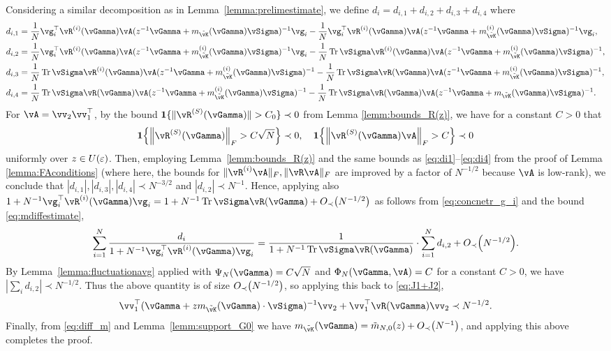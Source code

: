 \begin{proof-of-lemma}
	Considering a similar decomposition as in Lemma~\ref{lemma:prelimestimate}, we define
	$d_i=d_{i,1}+d_{i,2}+d_{i,3}+d_{i,4}$ where
	\begin{equation}\label{eq:di14_gamma}
	\begin{aligned}
	d_{i,1}&=\frac{1}{N}\vg_i^\top
\vR^{(i)}(\vGamma)\vA(z^{-1}\vGamma+m_{\tilde \vK}(\vGamma)\vSigma)^{-1}
	\vg_i-\frac{1}{N}\vg_i^\top
\vR^{(i)}(\vGamma)\vA(z^{-1}\vGamma+m_{\tilde \vK}^{(i)}(\vGamma)\vSigma)^{-1}\vg_i,\\
	d_{i,2}&=\frac{1}{N}\vg_i^\top
\vR^{(i)}(\vGamma)\vA(z^{-1}\vGamma+m_{\tilde \vK}^{(i)}(\vGamma)\vSigma)^{-1}
	\vg_i-\frac{1}{N}\Tr \vSigma
\vR^{(i)}(\vGamma)\vA(z^{-1}\vGamma+m_{\tilde \vK}^{(i)}(\vGamma)\vSigma)^{-1},\\
	d_{i,3}&=\frac{1}{N}\Tr \vSigma
\vR^{(i)}(\vGamma)\vA(z^{-1}\vGamma+m_{\tilde \vK}^{(i)}(\vGamma)\vSigma)^{-1}
	-\frac{1}{N}\Tr \vSigma \vR(\vGamma)\vA(z^{-1}\vGamma+m_{\tilde
\vK}^{(i)}(\vGamma)\vSigma)^{-1},\\
	d_{i,4}&=\frac{1}{N}\Tr \vSigma \vR(\vGamma)\vA(z^{-1}\vGamma+m_{\tilde
\vK}^{(i)}(\vGamma)\vSigma)^{-1}
	-\frac{1}{N}\Tr \vSigma \vR(\vGamma)\vA(z^{-1}\vGamma+m_{\tilde
\vK}(\vGamma)\vSigma)^{-1}.
	\end{aligned}
	\end{equation}
	For $\vA=\vv_2\vv_1^\top$, by the bound
$\bI\{\|\vR^{(S)}(\vGamma)\|>C_0\} \prec 0$
from Lemma \ref{lemm:bounds_R(z)}, we have for a constant $C>0$ that
	\begin{equation}
	\bI\left\{\norm{\vR^{(S)}(\vGamma)}_F>C\sqrt{N}\right\}\prec 0, \quad \bI\left\{\norm{\vR^{(S)}(\vGamma)\vA}_F>C\right\}\prec 0
	\end{equation} 
	uniformly over $z\in U(\varepsilon)$.
	Then, employing Lemma~\ref{lemm:bounds_R(z)} and the same bounds as
\eqref{eq:di1}--\eqref{eq:di4} from the proof of Lemma \ref{lemma:FAconditions}
(where here, the bounds for $\|\vR^{(i)}\vA\|_F,\|\vR\vA\|_F$ are
improved by a factor of $N^{-1/2}$ because $\vA$ is low-rank),
we conclude that $|d_{i,1}|,|d_{i,3}|,|d_{i,4}|
	\prec N^{-3/2}$ and $|d_{i,2}| \prec N^{-1}$.  
Hence, applying also $1+N^{-1}\vg_i^\top \vR^{(i)}(\vGamma)\vg_i
=1+N^{-1}\Tr \vSigma\vR(\vGamma)+\SD{N^{-1/2}}$ as follows from
\eqref{eq:concnetr_g_i} and the bound \eqref{eq:mdiffestimate},
	\[\sum_{i=1}^N\frac{d_i}{1+N^{-1}\vg_i^\top\vR^{(i)}(\vGamma)\vg_i}
=\frac{1}{1+N^{-1}\Tr \vSigma\vR(\vGamma)}
\cdot \sum_{i=1}^N d_{i,2}+\SD{N^{-1/2}}.\]
	By Lemma~\ref{lemma:fluctuationavg} applied with
$\Psi_N(\vGamma)=C\sqrt{N}$ and $\Phi_N(\vGamma,\vA)=C$ for a constant $C>0$,
we have $|\sum_i d_{i,2}| \prec N^{-1/2} $. Thus the above quantity is of size
$\SD{N^{-1/2}}$, so applying this back to \eqref{eq:J1+J2},
	\begin{align*}
		\vv_1^\top(\vGamma+zm_{\tilde \vK}(\vGamma)\cdot\vSigma
)^{-1}\vv_2+\vv_1^\top\vR(\vGamma)\vv_2 \prec N^{-1/2}.
	\end{align*}
	Finally, from \eqref{eq:diff_m} and Lemma~\ref{lemm:support_G0} 
we have $m_{\tilde \vK}(\vGamma)=\tilde m_{N,0}(z)+\SD{N^{-1}}$, and applying
this above completes the proof.
\end{proof-of-lemma}

